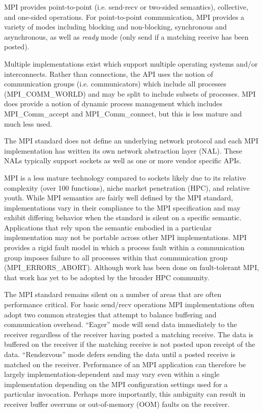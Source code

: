 MPI provides point-to-point (i.e. send-recv or two-sided semantics), collective, and
one-sided operations. For point-to-point communication, MPI provides a variety of modes
including blocking and non-blocking, synchronous and asynchronous, as well as \emph{ready}
mode (only send if a matching receive has been posted).

Multiple implementations exist\cite{ompi_04_pvmmpi_overview, Gropp:1996:HPI, Liu:2003:RDMA, intel-mpi, platform-mpi}
which support multiple operating systems and/or interconnects.  Rather than connections,
the API uses the notion of communication groups (i.e.  communicators) which include all
processes (MPI\_COMM\_WORLD) and may be split to include subsets of processes. MPI does
provide a notion of dynamic process management which includes MPI\_Comm\_accept and
MPI\_Comm\_connect, but this is less mature and much less used.

The MPI standard does not define an underlying network protocol and each MPI
implementation has written its own network abstraction layer (NAL). These NALs typically
support sockets as well as one or more vendor specific APIs.

MPI is a less mature technology compared to sockets likely due to its
relative complexity (over 100 functions), niche market penetration
(HPC), and relative youth. While MPI semantics are fairly well defined
by the MPI standard, implementations vary in their compliance to the
MPI specification and may exhibit differing behavior when the standard is
silent on a specific semantic. Applications that rely upon the
semantic embodied in a particular implementation may not be portable
across other MPI implementations. MPI provides a rigid fault model in
which a process fault within a communication group imposes failure to
all processes within that communication group
(MPI\_ERRORS\_ABORT). Although work has been done on fault-tolerant
MPI\cite{fagg04:_fault_toler_commun_librar_applic_high_perof, mpi-ft},
that work has yet to be adopted by the broader HPC community. 

The MPI standard remains silent on a number of areas that are often
performance critical. For basic send/recv operations MPI
implementations often adopt two common strategies that attempt to
balance buffering and communication overhead. ``Eager'' mode will send
data immediately to the receiver regardless of the receiver having
posted a matching receive. The data is buffered on the receiver if the
matching receive is not posted upon receipt of the
data. ``Rendezvous'' mode defers sending the data until a posted
receive is matched on the receiver. Performance of an MPI application
can therefore be largely implementation-dependent and may vary even
within a single implementation depending on the MPI configuration
settings used for a particular invocation. Perhaps more importantly,
this ambiguity can result in receiver buffer overruns or out-of-memory
(OOM) faults on the receiver.


